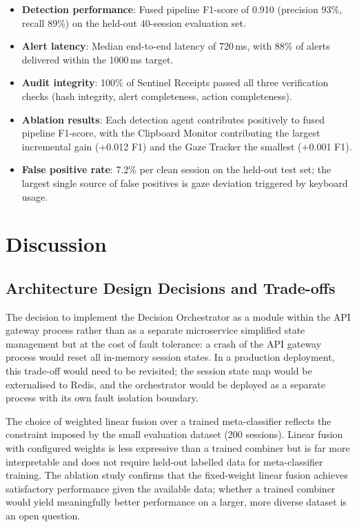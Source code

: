 \begin{itemize}
    \item \textbf{Detection performance}: Fused pipeline F1-score of 0.910 (precision 93\%, recall 89\%) on the held-out 40-session evaluation set.
    \item \textbf{Alert latency}: Median end-to-end latency of 720\,ms, with 88\% of alerts delivered within the 1000\,ms target.
    \item \textbf{Audit integrity}: 100\% of Sentinel Receipts passed all three verification checks (hash integrity, alert completeness, action completeness).
    \item \textbf{Ablation results}: Each detection agent contributes positively to fused pipeline F1-score, with the Clipboard Monitor contributing the largest incremental gain ($+$0.012 F1) and the Gaze Tracker the smallest ($+$0.001 F1).
    \item \textbf{False positive rate}: 7.2\% per clean session on the held-out test set; the largest single source of false positives is gaze deviation triggered by keyboard usage.
\end{itemize}

\section{Discussion}

\subsection{Architecture Design Decisions and Trade-offs}

The decision to implement the Decision Orchestrator as a module within the API gateway process rather than as a separate microservice simplified state management but at the cost of fault tolerance: a crash of the API gateway process would reset all in-memory session states. In a production deployment, this trade-off would need to be revisited; the session state map would be externalised to Redis, and the orchestrator would be deployed as a separate process with its own fault isolation boundary.

The choice of weighted linear fusion over a trained meta-classifier reflects the constraint imposed by the small evaluation dataset (200 sessions). Linear fusion with configured weights is less expressive than a trained combiner but is far more interpretable and does not require held-out labelled data for meta-classifier training. The ablation study confirms that the fixed-weight linear fusion achieves satisfactory performance given the available data; whether a trained combiner would yield meaningfully better performance on a larger, more diverse dataset is an open question.

